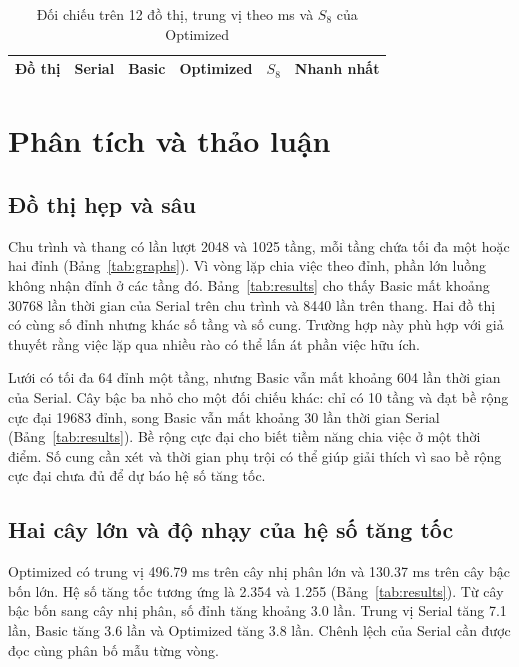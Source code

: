 \begin{table}[!htbp]
\centering\footnotesize
\setlength{\tabcolsep}{3.5pt}
\caption{Đối chiếu trên 12 đồ thị, trung vị theo ms và $S_8$ của Optimized}
\label{tab:comparison}
\begin{tabular}{@{}l *{3}{S[table-format=4.5]} S[table-format=1.5e-1] l@{}}
\toprule
Đồ thị & {Serial} & {Basic} & {Optimized} & {$S_8$} & Nhanh nhất \\
\midrule

\end{tabular}
\end{table}



\section{Phân tích và thảo luận}
\subsection{Đồ thị hẹp và sâu}
Chu trình và thang có lần lượt \num{2048} và \num{1025} tầng, mỗi tầng chứa tối đa một hoặc hai đỉnh (Bảng~\ref{tab:graphs}). Vì vòng lặp chia việc theo đỉnh, phần lớn luồng không nhận đỉnh ở các tầng đó. Bảng~\ref{tab:results} cho thấy Basic mất khoảng \num{30768} lần thời gian của Serial trên chu trình và \num{8440} lần trên thang. Hai đồ thị có cùng số đỉnh nhưng khác số tầng và số cung. Trường hợp này phù hợp với giả thuyết rằng việc lặp qua nhiều rào có thể lấn át phần việc hữu ích.

Lưới có tối đa 64 đỉnh một tầng, nhưng Basic vẫn mất khoảng 604 lần thời gian của Serial. Cây bậc ba nhỏ cho một đối chiếu khác: chỉ có 10 tầng và đạt bề rộng cực đại \num{19683} đỉnh, song Basic vẫn mất khoảng 30 lần thời gian Serial (Bảng~\ref{tab:results}). Bề rộng cực đại cho biết tiềm năng chia việc ở một thời điểm. Số cung cần xét và thời gian phụ trội có thể giúp giải thích vì sao bề rộng cực đại chưa đủ để dự báo hệ số tăng tốc.

\subsection{Hai cây lớn và độ nhạy của hệ số tăng tốc}
Optimized có trung vị \num{496.79} ms trên cây nhị phân lớn và \num{130.37} ms trên cây bậc bốn lớn. Hệ số tăng tốc tương ứng là \num{2.354} và \num{1.255} (Bảng~\ref{tab:results}). Từ cây bậc bốn sang cây nhị phân, số đỉnh tăng khoảng \num{3.0} lần. Trung vị Serial tăng \num{7.1} lần, Basic tăng \num{3.6} lần và Optimized tăng \num{3.8} lần. Chênh lệch của Serial cần được đọc cùng phân bố mẫu từng vòng.

